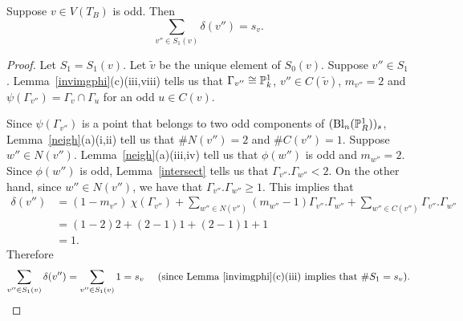 \begin{lemma}\label{odd1}
Suppose $v \in V(T_B)$ is odd. Then
 \[ \sum_{v'' \in S_1(v)} \delta(v'') = s_v .\]
\end{lemma}
\begin{proof}
Let $S_1 = S_1(v)$. Let $\tilde{v}$ be the unique element of $S_0(v)$. Suppose $v'' \in S_1$. Lemma~\ref{invimgphi}(c)(iii,viii) tells us that $\Gamma_{v''} \isom \P^1_k$, $v'' \in C(\tilde{v})$, $m_{v''} = 2$ and $\psi(\Gamma_{v''}) = \Gamma_v \cap \Gamma_u$ for an odd $u \in C(v)$. 

Since $\psi(\Gamma_{v''})$ is a point that belongs to two odd components of $(\mathrm{Bl}_n(\P^1_R))_s$, Lemma~\ref{neigh}(a)(i,ii) tell us that $\# N(v'') = 2$ and $\# C(v'') = 1$. Suppose $w'' \in N(v'')$. Lemma~\ref{neigh}(a)(iii,iv) tell us that $\phi(w'')$ is odd and $m_{w''} = 2$. 
Since $\phi(w'')$ is odd, Lemma~\ref{intersect} tells us that $\Gamma_{v''}.\Gamma_{w''} < 2$. On the other hand, since $w'' \in N(v'')$, we have that $\Gamma_{v''}.\Gamma_{w''} \geq 1$. This implies that
\begin{align*}
 \delta(v'') &= (1-m_{v''})\ \chi(\Gamma_{v''}) + \sum_{w'' \in N({v''})} (m_{w''} - 1) \Gamma_{v''}.\Gamma_{w''} + \sum_{w'' \in C({v''})} \Gamma_{v''}.\Gamma_{w''} \\
 &= (1-2)2 + (2-1)1 + (2-1)1 + 1 \\
 &= 1 .
\end{align*}
Therefore
\[ \sum_{v'' \in S_1(v)} \delta(v'') = \sum_{v'' \in S_1(v)} 1 = s_v \ \ \ \ ({\textup{since  Lemma~\ref{invimgphi}(c)(iii) implies that $\# S_1 = s_v$}}). \qedhere \] 
\end{proof}

